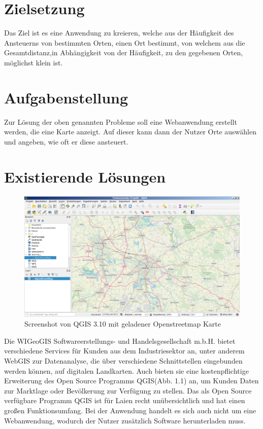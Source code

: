 \documentclass[a4paper, 12pt]{scrreprt}
\begin{document}
\section{Zielsetzung}
Das Ziel ist es eine Anwendung zu kreieren, welche aus der Häufigkeit des Ansteuerns von bestimmten Orten, einen Ort bestimmt, von welchem aus die Gesamtdistanz,in Abhängigkeit von der Häufigkeit, zu den gegebenen Orten, möglichst klein ist.
\section{Aufgabenstellung}
Zur Lösung der oben genannten Probleme soll eine Webanwendung erstellt werden, die eine Karte anzeigt.
Auf dieser kann dann der Nutzer Orte auswählen und angeben, wie oft er diese ansteuert.
\newpage
\section{Existierende Lösungen}
\begin{figure}[h]
\includegraphics[width=\linewidth]{qgis_oberflaeche.png}
\caption{Screenshot von QGIS 3.10 mit geladener Openstreetmap Karte}
\end{figure}
Die WIGeoGIS\cite{wigeogis} Softwareerstellungs- und Handelsgesellschaft m.b.H. bietet verschiedene Services für Kunden aus dem Industriesektor an, unter anderem WebGIS zur Datenanalyse, die über verschiedene Schnittstellen eingebunden werden können, auf digitalen Landkarten. 
Auch bieten sie eine kostenpflichtige Erweiterung des Open Source Programms QGIS(Abb. 1.1) an, um Kunden Daten zur Marktlage oder Bevölkerung zur Verfügung zu stellen.
Das als Open Source verfügbare Programm QGIS ist für Laien recht unübersichtlich und hat einen großen Funktionsumfang.
Bei der Anwendung handelt es sich auch nicht um eine Webanwendung, wodurch der Nutzer zusätzlich Software herunterladen muss.\\
\end{document}
